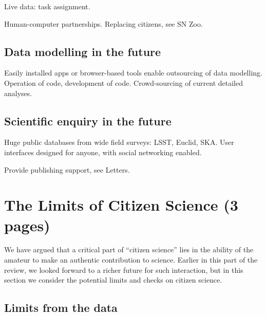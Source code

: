 \documentclass{ar2e}
\begin{document}
Live data: task assignment. 

Human-computer partnerships. Replacing citizens, see SN Zoo.



\subsection{Data modelling in the future}
\label{sec:future:models}

Easily installed apps or browser-based tools enable outsourcing of data
modelling. Operation of code, development of code. Crowd-sourcing of current
detailed analyses.



\subsection{Scientific enquiry in the future}
\label{sec:future:enquiry}

Huge public databases from wide field surveys: LSST, Euclid, SKA. User
interfaces designed for anyone, with social networking enabled. 

Provide publishing support, see Letters.



\section{The Limits of Citizen Science (3 pages)}
\label{sec:limits}


We have argued that a critical part of ``citizen science'' lies in the ability of
the amateur to make an authentic contribution to science. Earlier in this part
of the review, we looked forward to a richer future for such interaction, but in
this section we consider the potential limits and checks on citizen science. 


\subsection{Limits from the data}
\label{sec:limits:data}
\end{document}
